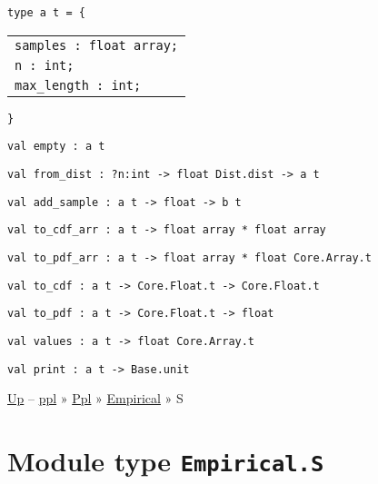 \protect\hyperlink{type-t}{}\texttt{type\ \textquotesingle{}a\ t}\texttt{\ =\ }\texttt{\{}

\begin{longtable}[c]{@{}l@{}}
\toprule
\protect\hyperlink{type-t.samples}{}\texttt{samples\ :\ float\ array;}\tabularnewline
\protect\hyperlink{type-t.n}{}\texttt{n\ :\ int;}\tabularnewline
\protect\hyperlink{type-t.maxux5flength}{}\texttt{max\_length\ :\ int;}\tabularnewline
\bottomrule
\end{longtable}

\texttt{\}}

\protect\hyperlink{val-empty}{}\texttt{val\ empty\ :\ \textquotesingle{}a\ t}

\protect\hyperlink{val-fromux5fdist}{}\texttt{val\ from\_dist\ :\ ?⁠n:int\ -\textgreater{}\ float\ Dist.dist\ -\textgreater{}\ \textquotesingle{}a\ t}

\protect\hyperlink{val-addux5fsample}{}\texttt{val\ add\_sample\ :\ \textquotesingle{}a\ t\ -\textgreater{}\ float\ -\textgreater{}\ \textquotesingle{}b\ t}

\protect\hyperlink{val-toux5fcdfux5farr}{}\texttt{val\ to\_cdf\_arr\ :\ \textquotesingle{}a\ t\ -\textgreater{}\ float\ array\ *\ float\ array}

\protect\hyperlink{val-toux5fpdfux5farr}{}\texttt{val\ to\_pdf\_arr\ :\ \textquotesingle{}a\ t\ -\textgreater{}\ float\ array\ *\ float\ Core.Array.t}

\protect\hyperlink{val-toux5fcdf}{}\texttt{val\ to\_cdf\ :\ \textquotesingle{}a\ t\ -\textgreater{}\ Core.Float.t\ -\textgreater{}\ Core.Float.t}

\protect\hyperlink{val-toux5fpdf}{}\texttt{val\ to\_pdf\ :\ \textquotesingle{}a\ t\ -\textgreater{}\ Core.Float.t\ -\textgreater{}\ float}

\protect\hyperlink{val-values}{}\texttt{val\ values\ :\ \textquotesingle{}a\ t\ -\textgreater{}\ float\ Core.Array.t}

\protect\hyperlink{val-print}{}\texttt{val\ print\ :\ \textquotesingle{}a\ t\ -\textgreater{}\ Base.unit}

\href{../index.html}{Up} -- \href{../../../index.html}{ppl} »
\href{../../index.html}{Ppl} » \href{../index.html}{Empirical} » S

\section{\texorpdfstring{Module type
\texttt{Empirical.S}}{Module type Empirical.S}}\label{module-type-empirical.s}

